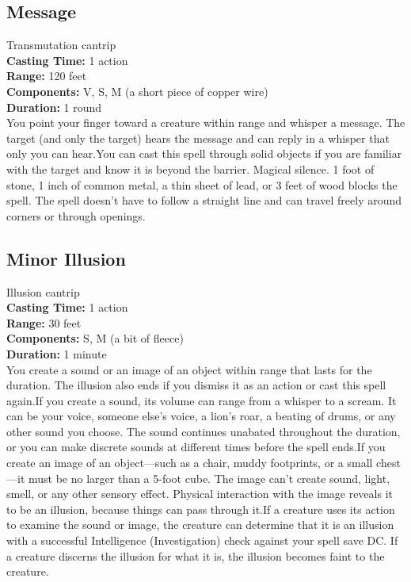 \documentclass[11pt, A4paper, english]{article}
\begin{document}
		\subsection{Message}
Transmutation cantrip \\
\textbf{Casting Time:} 1 action \\
\textbf{Range:} 120 feet \\
\textbf{Components:} V, S, M (a short piece of copper wire) \\
\textbf{Duration:} 1 round \\
You point your finger toward a creature within range and whisper a message. The target (and only the target) hears the message and can reply in a whisper that only you can hear.You can cast this spell through solid objects if you are familiar with the target and know it is beyond the barrier. Magical silence.  1  foot of stone,  1  inch of common metal, a thin sheet of lead, or 3 feet of wood blocks the spell. The spell doesn’t have to follow a straight line and can travel freely around corners or through openings.

		\subsection{Minor Illusion}
Illusion cantrip \\
\textbf{Casting Time:} 1 action \\
\textbf{Range:} 30 feet \\
\textbf{Components:} S, M (a bit of fleece) \\
\textbf{Duration:} 1 minute \\
You create a sound or an image of an object within range that lasts for the duration. The illusion also ends if you dismiss it as an action or cast this spell again.If you create a sound, its volume can range from a whisper to a scream. It can be your voice, someone else’s voice, a lion’s roar, a beating of drums, or any other sound you choose. The sound continues unabated throughout the duration, or you can make discrete sounds at different times before the spell ends.If you create an image of an object—such as a chair, muddy footprints, or a small chest—it must be no larger than a 5-foot cube. The image can’t create sound, light, smell, or any other sensory effect. Physical interaction with the image reveals it to be an illusion, because things can pass through it.If a creature uses its action to examine the sound or image, the creature can determine that it is an illusion with a successful Intelligence (Investigation) check against your spell save DC. If a creature discerns the illusion for what it is, the illusion becomes faint to the creature.
\end{document}
